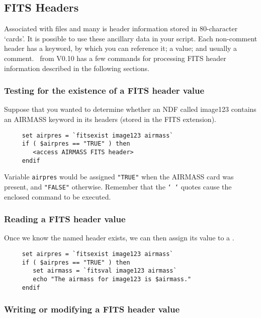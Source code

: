 \newpage
\subsection{FITS Headers\label{sc4_se_FITS_headers}}

Associated with  files and many
 is header information stored in 80-character
`cards'.  It is possible to use these ancillary data in your script.
Each non-comment header has a keyword, by which you can reference it;
a value; and usually a comment.  \KAPPAref\ from V0.10 has a few
commands for processing {\sf FITS} header information described in the
following sections.

\subsubsection{Testing for the existence of a FITS header value}

Suppose that you wanted to determine whether an NDF called image123
contains an AIRMASS keyword in its 
headers (stored in the FITS extension).

\small
\begin{verbatim}
     set airpres = `fitsexist image123 airmass`
     if ( $airpres == "TRUE" ) then
        <access AIRMASS FITS header>
     endif
\end{verbatim}
\normalsize
Variable {\tt airpres} would be assigned {\tt "TRUE"} when the AIRMASS
card was present, and {\tt "FALSE"} otherwise.  Remember that the
{\tt `~`} quotes cause the enclosed command to be executed.

\subsubsection{Reading a FITS header value}

Once we know the named header exists, we can then assign its value
to a .

\small
\begin{verbatim}
     set airpres = `fitsexist image123 airmass`
     if ( $airpres == "TRUE" ) then
        set airmass = `fitsval image123 airmass`
        echo "The airmass for image123 is $airmass."
     endif
\end{verbatim}
\normalsize

\subsubsection{Writing or modifying a FITS header value}

